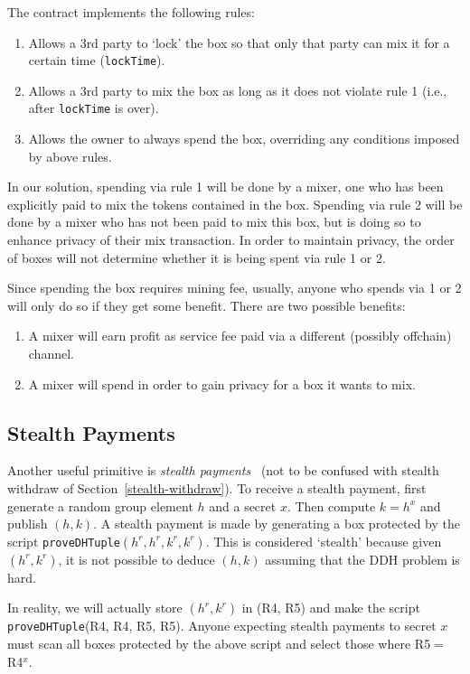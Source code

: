 \documentclass[runningheads]{llncs}
\begin{document}
The contract implements the following rules:
\begin{enumerate}
\item Allows a 3rd party to `lock' the box so that only that party can mix it for a certain time (\texttt{lockTime}).
\item Allows a 3rd party to mix the box as long as it does not violate rule 1 (i.e., after \texttt{lockTime} is over).
\item Allows the owner to always spend the box, overriding any conditions imposed by above rules.

\end{enumerate}

In our solution, spending via rule 1 will be done by a mixer, one who has been explicitly paid to mix the tokens contained in the box.
Spending via rule 2 will be done by a mixer who has not been paid to mix this box, but is doing so to enhance privacy of their mix transaction.
In order to maintain privacy, the order of boxes will not determine whether it is being spent via rule 1 or 2.

Since spending the box requires mining fee, usually, anyone who spends via 1 or 2 will only do so if they get some benefit.
There are two possible benefits:
\begin{enumerate}
\item A mixer will earn profit as service fee paid via a different (possibly offchain) channel.
\item A mixer will spend in order to gain privacy for a box it wants to mix.
\end{enumerate}

\subsection{Stealth Payments}

Another useful primitive is {\em stealth payments}~\cite{stealth-payments} (not to be confused with stealth withdraw of Section~\ref{stealth-withdraw}).
To receive a stealth payment, first generate a random group element $h$ and a secret $x$. Then compute $k = h^x$ and publish $(h, k)$.
A stealth payment is made by generating a box protected by the script \texttt{proveDHTuple}$(h^r, h^r, k^r, k^r)$.
This is considered `stealth' because given $(h^r, k^r)$, it is not possible to deduce $(h, k)$
assuming that the DDH problem is hard.

In reality, we will actually store $(h^r, k^r)$ in (R4, R5)
and make the script \texttt{proveDHTuple}(R4, R4, R5, R5).
Anyone expecting stealth payments to secret $x$ must scan all boxes protected by the above script and select those where R5$ = $R4$ ^ x$.
\end{document}
